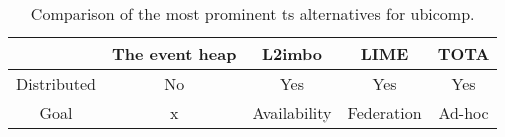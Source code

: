 
\begin{table}%
  \centering
  \begin{tabular}{c|cccc}%
      ~ & The event heap & L2imbo & LIME & TOTA \\
      \hline
      \hline
      Distributed & No & Yes & Yes & Yes \\
      Goal & x & Availability & Federation & Ad-hoc \\
  \end{tabular}
  \caption{Comparison of the most prominent \acl{ts} alternatives for \acl{ubicomp}.} %
  \label{tab:myfirsttable}
\end{table}